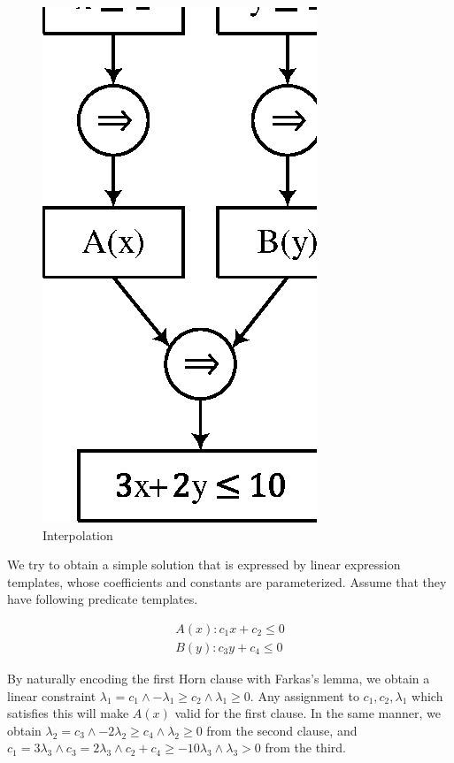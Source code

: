 \begin{figure}
\begin{center}
\includegraphics[scale=1]{figures/ex1.eps}
\end{center}
\caption{Interpolation}
\end{figure}

We try to obtain a simple solution that is expressed by linear
expression templates, whose coefficients and constants are
parameterized.  Assume that they have following predicate templates.

\begin{align*}
A(x) : c_1 x + c_2 \leq 0 \\
B(y) : c_3 y + c_4 \leq 0
\end{align*}

By naturally encoding the first Horn clause with Farkas's lemma, we
obtain a linear constraint
$\lambda_1 = c_1 \wedge - \lambda_1 \geq c_2 \wedge \lambda_1 \geq 0$.
Any assignment to $ c_1, c_2, \lambda_1 $ which satisfies this will
make $A(x)$ valid for the first clause.  In the same manner, we obtain
$\lambda_2 = c_3 \wedge - 2 \lambda_2 \geq c_4 \wedge \lambda_2 \geq 0$
from the second clause, and 
$c_1 = 3 \lambda_3 \wedge c_3 = 2 \lambda_3 \wedge c_2 + c_4 \geq -10 \lambda_3 \wedge \lambda_3 > 0$
from the third.

